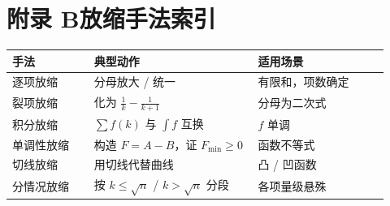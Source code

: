 \documentclass[11pt,a4paper]{ctexart}
\theoremstyle{definition}
\theoremstyle{remark}
\begin{document}
\section*{附录 B\quad 放缩手法索引}

\begin{table}[H]
\centering
\small
\renewcommand{\arraystretch}{1.4}
\begin{tabular}{@{}p{0.2\linewidth}p{0.4\linewidth}p{0.32\linewidth}@{}}
\toprule
\textbf{手法} & \textbf{典型动作} & \textbf{适用场景} \\
\midrule
逐项放缩 & 分母放大 / 统一 & 有限和，项数确定 \\
裂项放缩 & 化为 $\frac1k-\frac1{k+1}$ & 分母为二次式 \\
积分放缩 & $\sum f(k)$ 与 $\int f$ 互换 & $f$ 单调 \\
单调性放缩 & 构造 $F=A-B$，证 $F_{\min}\ge0$ & 函数不等式 \\
切线放缩 & 用切线代替曲线 & 凸 / 凹函数 \\
分情况放缩 & 按 $k\le\sqrt n$ / $k>\sqrt n$ 分段 & 各项量级悬殊 \\
\bottomrule
\end{tabular}
\end{table}
\end{document}

